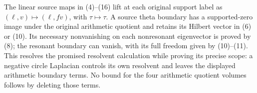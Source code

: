 \documentclass[11pt]{article}
\begin{document}
The linear source maps in (4)--(16) lift at each original support
label as \((\ell,v)\mapsto(\ell,fv)\), with
\(\tau\mapsto\tau\). A source theta boundary has a supported-zero
image under the original arithmetic quotient and retains its
Hilbert vector in (6) or (10). Its necessary nonvanishing on each
nonresonant eigenvector is proved by (8); the resonant boundary can
vanish, with its full freedom given by (10)--(11). This resolves the promised
resolvent calculation while proving its precise scope: a negative
circle Laplacian controls its own resolvent and leaves the displayed
arithmetic boundary terms. No bound for the four arithmetic quotient
volumes follows by deleting those terms.
\end{document}
